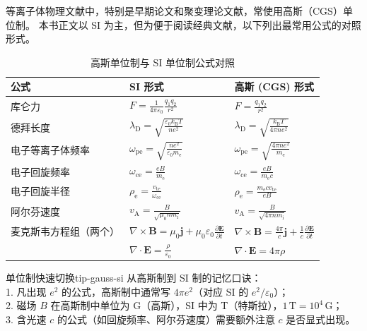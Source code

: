 \documentclass[12pt,a4paper,openany,oneside]{book}
\newcommand{\ii}{\mathrm{i}}
\newcommand{\ee}{\mathrm{e}}
\newcommand{\eps}{\varepsilon}
\newcommand{\vect}[1]{\bm{#1}}
\begin{document}
等离子体物理文献中，特别是早期论文和聚变理论文献，常使用高斯（CGS）单位制。
本书正文以 SI 为主，但为便于阅读经典文献，以下列出最常用公式的对照形式。

\begin{table}[htbp]
\centering
\caption{高斯单位制与 SI 单位制公式对照}
\small
\begin{tabular}{@{}lp{5.2cm}p{5.2cm}@{}}
\toprule
\textbf{公式} & \textbf{SI 形式} & \textbf{高斯 (CGS) 形式} \\
\midrule
库仑力 & $\displaystyle F=\frac{1}{4\pi\eps_0}\frac{q_1 q_2}{r^2}$ & $\displaystyle F=\frac{q_1 q_2}{r^2}$ \\
\midrule
德拜长度 & $\displaystyle \lambda_\mathrm{D}=\sqrt{\frac{\eps_0 k_\mathrm{B} T}{n e^2}}$ & $\displaystyle \lambda_\mathrm{D}=\sqrt{\frac{k_\mathrm{B} T}{4\pi n e^2}}$ \\
\midrule
电子等离子体频率 & $\displaystyle \omega_{\mathrm{p}\ee}=\sqrt{\frac{n e^2}{\eps_0 m_\ee}}$ & $\displaystyle \omega_{\mathrm{p}\ee}=\sqrt{\frac{4\pi n e^2}{m_\ee}}$ \\
\midrule
电子回旋频率 & $\displaystyle \omega_{\mathrm{c}\ee}=\frac{e B}{m_\ee}$ & $\displaystyle \omega_{\mathrm{c}\ee}=\frac{e B}{m_\ee c}$ \\
\midrule
电子回旋半径 & $\displaystyle \rho_\ee=\frac{v_{\mathrm{t}\ee}}{\omega_{\mathrm{c}\ee}}$ & $\displaystyle \rho_\ee=\frac{m_\ee c v_{\mathrm{t}\ee}}{e B}$ \\
\midrule
阿尔芬速度 & $\displaystyle v_\mathrm{A}=\frac{B}{\sqrt{\mu_0 n m_\ii}}$ & $\displaystyle v_\mathrm{A}=\frac{B}{\sqrt{4\pi n m_\ii}}$ \\
\midrule
麦克斯韦方程组（两个） & $\displaystyle \nabla\times\vect{B}=\mu_0\vect{j}+\mu_0\eps_0\frac{\partial\vect{E}}{\partial t}$ & $\displaystyle \nabla\times\vect{B}=\frac{4\pi}{c}\vect{j}+\frac{1}{c}\frac{\partial\vect{E}}{\partial t}$ \\
 & $\displaystyle \nabla\cdot\vect{E}=\frac{\rho}{\eps_0}$ & $\displaystyle \nabla\cdot\vect{E}=4\pi\rho$ \\
\bottomrule
\end{tabular}
\end{table}

\begin{tip}{单位制快速切换}{tip-gauss-si}
从高斯制到 SI 制的记忆口诀：\\
1. 凡出现 $e^2$ 的公式，高斯制中通常写 $4\pi e^2$（对应 SI 的 $e^2/\eps_0$）；\\
2. 磁场 $B$ 在高斯制中单位为 G（高斯），SI 中为 T（特斯拉），$1\,\mathrm{T}=10^4\,\mathrm{G}$；\\
3. 含光速 $c$ 的公式（如回旋频率、阿尔芬速度）需要额外注意 $c$ 是否显式出现。
\end{tip}
\end{document}
